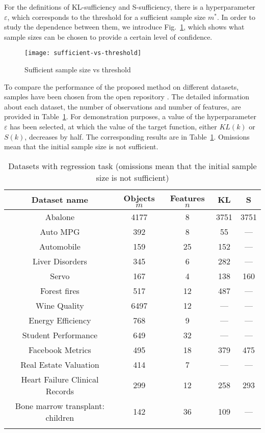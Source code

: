 \documentclass[sn-mathphys-num]{sn-jnl}%
\begin{document}
For the definitions of KL-sufficiency and S-sufficiency, there is a hyperparameter $\varepsilon$, which corresponds to the threshold for a sufficient sample size $m^*$. In order to study the dependence between them, we introduce Fig.~\ref{sufficient-vs-threshold}, which shows what sample sizes can be chosen to provide a certain level of confidence.

\begin{figure}[ht]
    \centering
    \texttt{[image: sufficient-vs-threshold]}
    \caption{Sufficient sample size vs threshold}
    \label{sufficient-vs-threshold}
\end{figure}

To compare the performance of the proposed method on different datasets, samples have been chosen from the open repository \cite{UCI}. The detailed information about each dataset, the number of observations and number of features, are provided in Table~\ref{table}. For demonstration purposes, a value of the hyperparameter $\varepsilon$ has been selected, at which the value of the target function, either $KL(k)$ or $S(k)$, decreases by half. The corresponding results are in Table~\ref{table}. Omissions mean that the initial sample size is not sufficient.

\begin{table}[ht]
    \centering
    \caption{Datasets with regression task (omissions mean that the initial sample size is not sufficient)}\label{table}
    \begin{tabular}{ccccc}
    \toprule
    Dataset name & Objects $m$ & Features $n$ & KL & S \\
    \midrule
    Abalone & 4177 & 8 & 3751 & 3751\\
    Auto MPG & 392 & 8 & 55 & --- \\
    Automobile & 159 & 25 & 152 & --- \\
    Liver Disorders & 345 & 6 & 282 & --- \\
    Servo & 167 & 4 & 138 & 160 \\
    Forest fires & 517 & 12 & 487 & --- \\
    Wine Quality & 6497 & 12 & --- & --- \\
    Energy Efficiency & 768 & 9 & --- & --- \\
    Student Performance & 649 & 32 & --- & --- \\
    Facebook Metrics & 495 & 18 & 379 & 475  \\
    Real Estate Valuation & 414 & 7 & --- & --- \\
    Heart Failure Clinical Records & 299 & 12 & 258 & 293 \\
    Bone marrow transplant: children & 142 & 36 & 109 & --- \\
    \botrule
    \end{tabular}
\end{table}
\end{document}
